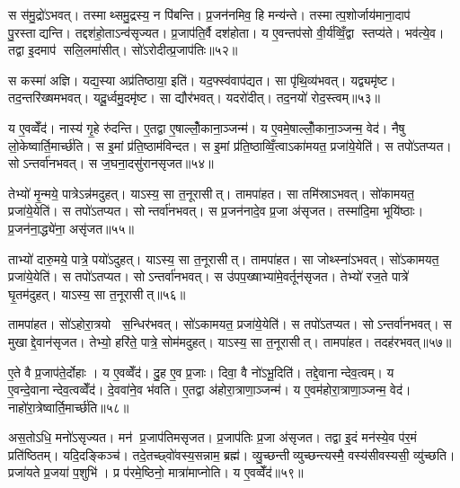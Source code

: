 स स॑मु॒द्रो॑ऽभवत्। तस्माथ्समु॒द्रस्य॒ न पि॑बन्ति। प्र॒जन॑नमिव॒ हि मन्य॑न्ते। तस्मात्प॒शोर्जाय॑माना॒दाप॑ पु॒रस्ताद्यन्ति। तद्दश॑हो॒ताऽन्व॑सृज्यत। प्र॒जाप॑ति॒र्वै दश॑होता। य ए॒वन्तप॑सो वी॒र्य॑व्विँ॒द्वा स्तप्य॑ते। भव॑त्ये॒व। तद्वा इ॒दमाप॑ सलि॒लमा॑सीत्। सो॑ऽरोदीत्प्र॒जाप॑तिः॥५२॥

स कस्मा॑ अज्ञि। यद्य॒स्या अप्र॑तिष्ठाया॒ इति॑। यद॒फ्स्व॑वाप॑द्यत। सा पृ॑थि॒व्य॑भवत्। यद्व्यमृ॑ष्ट। तद॒न्तरि॑ख्षमभवत्। यदू॒र्ध्वमु॒दमृ॑ष्ट। सा द्यौर॑भवत्। यदरो॑दीत्। तद॒नयो॑ रोद॒स्त्वम्॥५३॥

य ए॒वव्वेँद॑। नास्य॑ गृ॒हे रु॑दन्ति। ए॒तद्वा ए॒षाल्लोँ॒काना॒ञ्जन्म॑। य ए॒वमे॒षाल्लोँ॒काना॒ञ्जन्म॒ वेद॑। नैषु लो॒केष्वार्ति॒मार्च्छ॑ति। स इ॒मां प्र॑ति॒ष्ठाम॑विन्दत। स इ॒मां प्र॑ति॒ष्ठाव्विँ॒त्वाऽका॑मयत॒ प्रजा॑ये॒येति॑। स तपो॑ऽतप्यत। सोऽन्तर्वा॑नभवत्। स ज॒घना॒दसु॑रानसृजत॥५४॥

तेभ्यो॑ मृ॒न्मये॒ पात्रेऽन्न॑मदुहत्। याऽस्य॒ सा त॒नूरासीत्। तामपा॑हत। सा तमि॑स्राऽभवत्। सो॑कामयत॒ प्रजा॑ये॒येति॑। स तपो॑ऽतप्यत। सोन्तर्वा॑नभवत्। स प्र॒जन॑नादे॒व प्र॒जा अ॑सृजत। तस्मा॑दि॒मा भूयि॑ष्ठाः। प्र॒जन॑ना॒द्ध्ये॑ना॒ असृ॑जत॥५५॥

ताभ्यो॑ दारु॒मये॒ पात्रे॒ पयो॑ऽदुहत्। याऽस्य॒ सा त॒नूरासीत्। तामपा॑हत। सा जोथ्स्ना॑ऽभवत्। सो॑ऽकामयत॒ प्रजा॑ये॒येति॑। स तपो॑ऽतप्यत। सोऽन्तर्वा॑नभवत्। स उ॑पप॒ख्षाभ्या॑मे॒वर्तून॑सृजत। तेभ्यो॑ रज॒ते पात्रे॑ घृ॒तम॑दुहत्। याऽस्य॒ सा त॒नूरासीत्॥५६॥

तामपा॑हत। सो॑ऽहोरा॒त्रयो स॒न्धिर॑भवत्। सो॑ऽकामयत॒ प्रजा॑ये॒येति॑। स तपो॑ऽतप्यत। सोऽन्तर्वा॑नभवत्। स मुखाद्दे॒वान॑सृजत। तेभ्यो॒ हरि॑ते॒ पात्रे॒ सोम॑मदुहत्। याऽस्य॒ सा त॒नूरासीत्। तामपा॑हत। तदह॑रभवत्॥५७॥

ए॒ते वै प्र॒जाप॑ते॒र्दोहाः। य ए॒वव्वेँद॑। दु॒ह ए॒व प्र॒जाः। दिवा॒ वै नो॑ऽभू॒दिति॑। तद्दे॒वानान्देव॒त्वम्। य ए॒वन्दे॒वानान्देव॒त्वव्वेँद॑। दे॒ववा॑ने॒व भ॑वति। ए॒तद्वा अ॑होरा॒त्राणा॒ञ्जन्म॑। य ए॒वम॑होरा॒त्राणा॒ञ्जन्म॒ वेद॑। नाहो॑रा॒त्रेष्वार्ति॒मार्च्छ॑ति॥५८॥

अस॒तोऽधि॒ मनो॑ऽसृज्यत। मन॑ प्र॒जाप॑तिमसृजत। प्र॒जाप॑तिः प्र॒जा अ॑सृजत। तद्वा इ॒दं मन॑स्ये॒व प॑र॒मं प्रति॑ष्ठितम्। यदि॒दङ्किञ्च॑। तदे॒तच्छ्वो॑वस्य॒सन्नाम॒ ब्रह्म॑। व्यु॒च्छन्तीव्युच्छन्त्यस्मै॒ वस्य॑सीवस्यसी॒ व्यु॑च्छति। प्रजा॑यते प्र॒जया॑ प॒शुभि॑। प्र प॑रमे॒ष्ठिनो॒ मात्रा॑माप्नोति। य ए॒वव्वेँद॑॥५९॥

